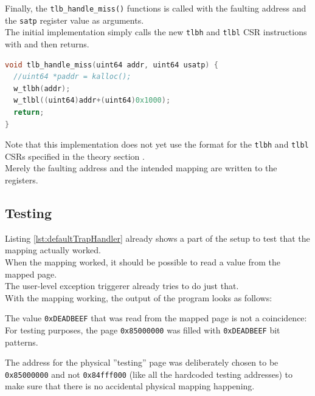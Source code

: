 Finally, the \texttt{tlb\_handle\_miss()} functions is called with the faulting address and the \texttt{satp} register
value as arguments.\\
The initial implementation simply calls the new \texttt{tlbh} and \texttt{tlbl} CSR instructions with and then
returns.
\begin{lstlisting}[language={C},float=h!,
    label={lst:defaultTrapHandler}, caption={Simple TLB Miss Exception handler for a single fixed address}]
void tlb_handle_miss(uint64 addr, uint64 usatp) {
  //uint64 *paddr = kalloc();
  w_tlbh(addr);
  w_tlbl((uint64)addr+(uint64)0x1000);
  return;
}
\end{lstlisting}

Note that this implementation does not yet use the format for the \texttt{tlbh} and \texttt{tlbl} CSRs specified
in the theory section .\\
Merely the faulting address and the intended mapping are written to the registers.

\subsection{Testing}
Listing \ref{lst:defaultTrapHandler} already shows a part of the setup to test that the mapping actually worked.\\
When the mapping worked, it should be possible to read a value from the mapped page.\\
The user-level exception triggerer already tries to do just that.\\
With the mapping working, the output of the program looks as follows:


The value \texttt{0xDEADBEEF} that was read from the mapped page is not a coincidence:\\
For testing purposes, the page \texttt{0x85000000} was filled with \texttt{0xDEADBEEF} bit patterns.

The address for the physical ''testing'' page was deliberately chosen to be \texttt{0x85000000} and not
\texttt{0x84fff000} (like all the hardcoded testing addresses) to make sure that there is no accidental physical
mapping happening.\\



